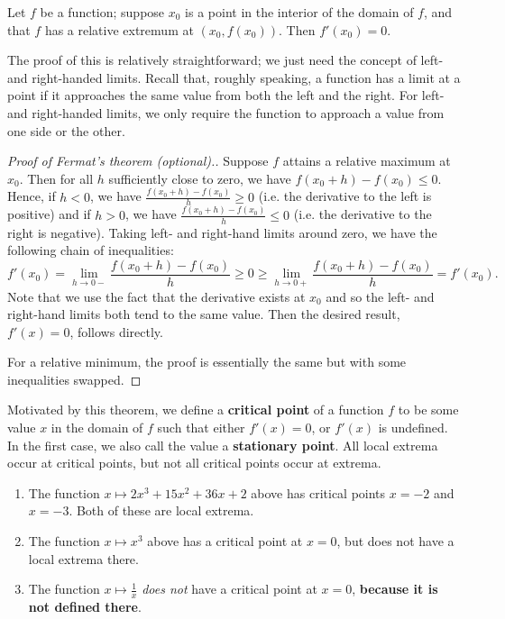 \begin{thm}
  Let $ f $ be a function; suppose $ x_0 $ is a point in the interior of the domain of $ f $, and that $ f $ has a relative extremum
  at $ (x_0, f(x_0)) $. Then $ f'(x_0) = 0 $.
\end{thm}
The proof of this is relatively straightforward; we just need the concept of left- and right-handed limits. Recall that, roughly speaking,
a function has a limit at a point if it approaches the same value from both the left and the right. For left- and right-handed limits, we
only require the function to approach a value from one side or the other.
\begin{proof}[Proof of Fermat's theorem (optional).]
  Suppose $ f $ attains a relative maximum at $ x_0 $. Then for all $ h $ sufficiently close to zero, we have $ f(x_0 + h) - f(x_0) \leq 0 $.
  Hence, if $ h < 0 $, we have $ \frac{f(x_0 + h) - f(x_0)}{h} \geq 0 $ (i.e. the derivative to the left is positive) and if $ h > 0 $, we
  have $ \frac{f(x_0 + h) - f(x_0)}{h} \leq 0 $ (i.e. the derivative to the right is negative). Taking left- and right-hand limits around
  zero, we have the following chain of inequalities:
  \begin{displaymath}
    f'(x_0) = \lim_{h \to 0-} \frac{f(x_0 + h) - f(x_0)}{h} \geq 0 \geq \lim_{h \to 0+} \frac{f(x_0 + h) - f(x_0)}{h} = f'(x_0).
  \end{displaymath}
  Note that we use the fact that the derivative exists at $ x_0 $ and so the left- and right-hand limits both tend to the same value. Then the
  desired result, $ f'(x) = 0 $, follows directly.

  For a relative minimum, the proof is essentially the same but with some inequalities swapped.
\end{proof}

Motivated by this theorem, we define a \textbf{critical point} of a function $ f $ to be some value $ x $ in the domain of $ f $ such
that either $ f'(x) = 0 $, or $ f'(x) $ is undefined. In the first case, we also call the value a \textbf{stationary point}. All local
extrema occur at critical points, but not all critical points occur at extrema.

\begin{exs}\leavevmode
  \begin{enumerate}
    \item The function $ x \mapsto 2x^3 + 15x^2 + 36x + 2 $ above has critical points $ x = -2 $ and $ x = -3 $. Both of
          these are local extrema.
    \item The function $ x \mapsto x^3 $ above has a critical point at $ x = 0 $, but does not have a local extrema there.
    \item The function $ x \mapsto \frac{1}{x} $ \textit{does not} have a critical point at $ x = 0 $, \textbf{because it is not defined there}.
  \end{enumerate}
\end{exs}

